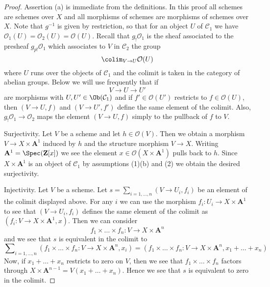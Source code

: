 \begin{proof}
Assertion (a) is immediate from the definitions.
In this proof all schemes are schemes over $X$ and all morphisms of
schemes are morphisms of schemes over $X$. Note that $g^{-1}$ is
given by restriction, so that for an object $U$ of $\mathcal{C}_1$
we have $\mathcal{O}_1(U) = \mathcal{O}_2(U) = \mathcal{O}(U)$.
Recall that $g_!\mathcal{O}_1$ is the sheaf associated to the presheaf
$g_{p!}\mathcal{O}_1$ which associates to $V$ in $\mathcal{C}_2$ the group
$$
\colim_{V \to U} \mathcal{O}(U)
$$
where $U$ runs over the objects of $\mathcal{C}_1$ and the colimit is
taken in the category of abelian groups. Below we will use frequently
that if
$$
V \to U \to U'
$$
are morphisms with $U, U' \in \Ob(\mathcal{C}_1)$
and if $f' \in \mathcal{O}(U')$ restricts to $f \in \mathcal{O}(U)$,
then $(V \to U, f)$ and $(V \to U', f')$ define the same element of the
colimit. Also, $g_!\mathcal{O}_1 \to \mathcal{O}_2$ maps the element
$(V \to U, f)$ simply to the pullback of $f$ to $V$.

\medskip\noindent
Surjectivity. Let $V$ be a scheme and let $h \in \mathcal{O}(V)$.
Then we obtain a morphism $V \to X \times \mathbf{A}^1$ induced by $h$
and the structure morphism $V \to X$. Writing
$\mathbf{A}^1 = \Spec(\mathbf{Z}[x])$ we see the element
$x \in \mathcal{O}(X \times \mathbf{A}^1)$ pulls
back to $h$. Since $X \times \mathbf{A}^1$ is an object of $\mathcal{C}_1$
by assumptions (1)(b) and (2) we obtain the desired surjectivity.

\medskip\noindent
Injectivity. Let $V$ be a scheme. Let
$s = \sum_{i = 1, \ldots, n} (V \to U_i, f_i)$ be an element of the colimit
displayed above. For any $i$ we can use the morphism
$f_i : U_i \to X \times \mathbf{A}^1$
to see that $(V \to U_i, f_i)$ defines the same element of the colimit as
$(f_i : V \to X \times \mathbf{A}^1, x)$. Then we can consider
$$
f_1 \times \ldots \times f_n : V \to X \times \mathbf{A}^n
$$
and we see that $s$ is equivalent in the colimit to
$$
\sum\nolimits_{i = 1, \ldots, n}
(f_1 \times \ldots \times f_n : V \to X \times \mathbf{A}^n, x_i) =
(f_1 \times \ldots \times f_n : V \to X \times \mathbf{A}^n,
x_1 + \ldots + x_n)
$$
Now, if $x_1 + \ldots + x_n$ restricts to zero on $V$, then we see
that $f_1 \times \ldots \times f_n$ factors through
$X \times \mathbf{A}^{n - 1} = V(x_1 + \ldots + x_n)$. Hence we see
that $s$ is equivalent to zero in the colimit.
\end{proof}











